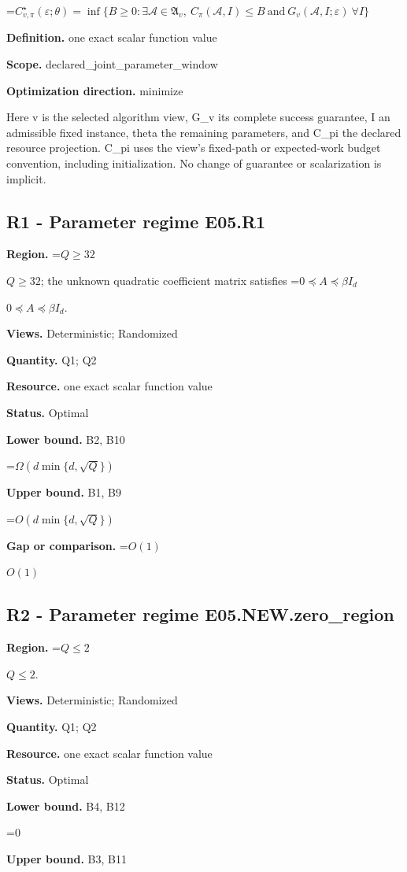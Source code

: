 \documentclass[10pt,a4paper]{article}
\newcommand{\AtlasMath}[1]{\par\begingroup\centering\setbox0=\hbox{$\displaystyle #1$}\ifdim\wd0>1.4\linewidth\typeout{ATLAS WIDE FORMULA: \the\wd0}\fi\ifdim\wd0>\linewidth\resizebox{\linewidth}{!}{\box0}\else\box0\fi\par\endgroup}
\newcommand{\AtlasInlineMath}[1]{\begingroup\setbox0=\hbox{$#1$}\ifdim\wd0>.4\linewidth\endgroup\AtlasMath{#1}\else\endgroup$#1$\fi}
\begin{document}
\AtlasMath{C^\star_{v,\pi}(\varepsilon;\theta)=\inf\{B\ge0:\exists\mathcal A\in\mathfrak A_v,\ C_\pi(\mathcal A,I)\le B\ \text{and}\ G_v(\mathcal A,I;\varepsilon)\ \forall I\}}
\textbf{Definition.} one exact scalar function value

\textbf{Scope.} declared\_joint\_parameter\_window

\textbf{Optimization direction.} minimize

Here v is the selected algorithm view, G\_v its complete success guarantee, I an admissible fixed instance, theta the remaining parameters, and C\_pi the declared resource projection. C\_pi uses the view's fixed-path or expected-work budget convention, including initialization. No change of guarantee or scalarization is implicit.

\subsection{R1 - Parameter regime E05.R1}
\textbf{Region.} \AtlasInlineMath{Q\ge32}; the unknown quadratic coefficient matrix satisfies \AtlasInlineMath{0\preceq A\preceq\beta I_d}.

\textbf{Views.} Deterministic; Randomized

\textbf{Quantity.} Q1; Q2

\textbf{Resource.} one exact scalar function value

\textbf{Status.} Optimal

\textbf{Lower bound.} B2, B10

\AtlasMath{\Omega(d\min\{d,\sqrt Q\})}
\textbf{Upper bound.} B1, B9

\AtlasMath{O(d\min\{d,\sqrt Q\})}
\textbf{Gap or comparison.} \AtlasInlineMath{O(1)}

\subsection{R2 - Parameter regime E05.NEW.zero\_region}
\textbf{Region.} \AtlasInlineMath{Q\le2}.

\textbf{Views.} Deterministic; Randomized

\textbf{Quantity.} Q1; Q2

\textbf{Resource.} one exact scalar function value

\textbf{Status.} Optimal

\textbf{Lower bound.} B4, B12

\AtlasMath{0}
\textbf{Upper bound.} B3, B11
\end{document}

